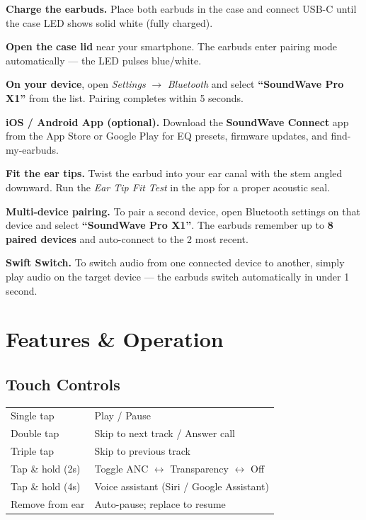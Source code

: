 \documentclass[11pt, a4paper]{article}
\begin{document}
\begin{steps}
  \item \textbf{Charge the earbuds.} Place both earbuds in the case and connect USB-C until
    the case LED shows solid white (fully charged).
  \item \textbf{Open the case lid} near your smartphone. The earbuds enter pairing mode
    automatically — the LED pulses blue/white.
  \item \textbf{On your device}, open \textit{Settings} $\to$ \textit{Bluetooth} and select
    \textbf{``SoundWave Pro X1''} from the list. Pairing completes within 5 seconds.
  \item \textbf{iOS / Android App (optional).} Download the \textbf{SoundWave Connect} app
    from the App Store or Google Play for EQ presets, firmware updates, and find-my-earbuds.
  \item \textbf{Fit the ear tips.} Twist the earbud into your ear canal with the stem angled
    downward. Run the \textit{Ear Tip Fit Test} in the app for a proper acoustic seal.
  \item \textbf{Multi-device pairing.} To pair a second device, open Bluetooth settings on
    that device and select \textbf{``SoundWave Pro X1''}. The earbuds remember up to
    \textbf{8 paired devices} and auto-connect to the 2 most recent.
\end{steps}

\begin{tipbox}
  \textbf{Swift Switch.} To switch audio from one connected device to another, simply play
  audio on the target device — the earbuds switch automatically in under 1 second.
\end{tipbox}

\section[Features \& Operation]{Features \& Operation\label{sec:features}}

\subsection{Touch Controls}

\begin{tabularx}{\linewidth}{@{}K@{\hspace{8mm}}>{\raggedright\arraybackslash}X@{}}
\setlength{\parskip}{0pt}%
Single tap        & Play / Pause \\
Double tap        & Skip to next track / Answer call \\
Triple tap        & Skip to previous track \\
Tap \& hold (2s)  & Toggle ANC $\leftrightarrow$ Transparency $\leftrightarrow$ Off \\
Tap \& hold (4s)  & Voice assistant (Siri / Google Assistant) \\
Remove from ear   & Auto-pause; replace to resume \\
\end{tabularx}
\end{document}
